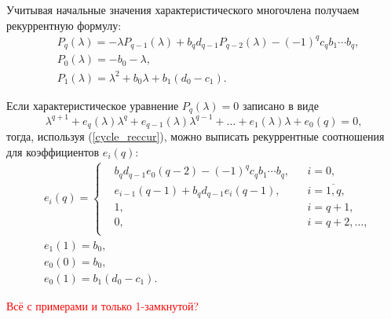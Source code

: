     Учитывая начальные значения характеристического многочлена получаем рекуррентную формулу:
    \begin{equation} \label{cycle_reccur}
        \begin{split}
            & P_q (\lambda) = -\lambda P_{q-1} (\lambda) + b_q d_{q-1} P_{q-2} (\lambda) - (-1)^{q} c_q b_1 \cdots b_q, \\
            & P_0 (\lambda) = - b_0 -\lambda, \\
            & P_1 (\lambda) = \lambda^2 + b_0 \lambda + b_1 (d_0 - c_1).
        \end{split}
    \end{equation}

    Если характеристическое уравнение \( P_q (\lambda) = 0 \) записано в виде
    \begin{equation*}
        \lambda^{q+1} + e_q(\lambda) \lambda^q + e_{q-1}(\lambda) \lambda^{q-1} + \dots + e_{1}(\lambda) \lambda + e_0(q) = 0,
    \end{equation*}
    тогда, используя (\ref{cycle_reccur}), можно выписать рекуррентные  соотношения для коэффициентов \(e_i (q)\):
    \begin{equation} \label{cycle_reccur_coeffs}
        \begin{split}
        & e_i (q) = \left\{\begin{split}
            & b_q d_{q-1} e_0(q-2) - (-1)^q c_q b_1 \cdots b_q, && i = 0, \\
            & e_{i-1} (q-1) + b_q d_{q-1} e_i (q-1), && i = \overline{1,q}, \\
            & 1, && i = q+1, \\
            & 0, && i = q+2, \dots, \\
        \end{split}\right. \\
        & e_{1} (1) = b_0, \\
        & e_{0} (0) = b_0, \\
        & e_{0} (1) = b_1 (d_0 - c_1).
        \end{split}
    \end{equation}

    \textcolor{red}{Всё с примерами и только 1-замкнутой?}


